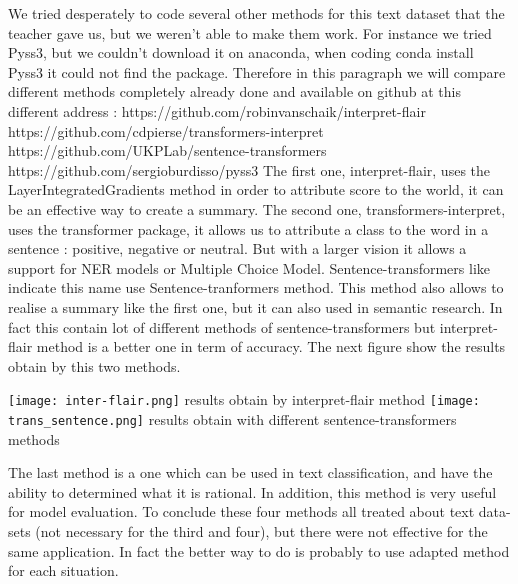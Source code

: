 \documentclass[sigplan,screen]{acmart}
\begin{document}
\Large
We tried desperately to code several other methods for this text dataset that the teacher gave us, but we weren't able to make them work. For instance we tried Pyss3, but we couldn't download it on anaconda, when coding conda install Pyss3 it could not find the package.
Therefore in this paragraph we will compare different methods completely already done and available on github at this different address :
\small
https://github.com/robinvanschaik/interpret-flair
\newline
https://github.com/cdpierse/transformers-interpret
\newline
https://github.com/UKPLab/sentence-transformers
\newline
https://github.com/sergioburdisso/pyss3
\newline
\newline
\Large
The first one, interpret-flair, uses the LayerIntegratedGradients method in order to attribute score to the world, it can be an effective way to create a summary.
The second one, transformers-interpret, uses the transformer package, it allows us to attribute a class to the word in a sentence : positive, negative or neutral. But with a larger vision it allows a support for NER models or Multiple Choice Model.
Sentence-transformers like indicate this name use Sentence-tranformers method. This method also allows to realise a summary like the first one, but it can also used in semantic research. In fact this contain lot of different methods of sentence-transformers but interpret-flair method is a better one in term of accuracy. The next figure show the results obtain by this two methods.

        \texttt{[image: inter-flair.png]}
        \small
        results obtain by interpret-flair method
        \newline
    \centering
        \texttt{[image: trans\_sentence.png]}
        \small
        results obtain with different sentence-transformers methods
        \newline

\Large
The last method is a one which can be used in text classification, and have the ability to determined what it is rational. In addition, this method is very useful for model evaluation.
\newline
To conclude these four methods all treated about text data-sets (not necessary for the third and four), but there were not effective for the same application. In fact the better way to do is probably to use adapted method for each situation.
\end{document}
